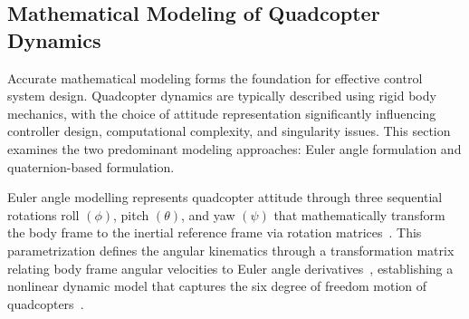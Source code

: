 



\subsection{Mathematical Modeling of Quadcopter Dynamics}

Accurate mathematical modeling forms the foundation for effective control system design. Quadcopter dynamics are typically described using rigid body mechanics, with the choice of attitude representation significantly influencing controller design, computational complexity, and singularity issues. This section examines the two predominant modeling approaches: Euler angle formulation and quaternion-based formulation.

\noindent Euler angle modelling represents quadcopter attitude through three sequential rotations roll $(\phi)$, pitch $(\theta)$, and yaw $(\psi)$ that mathematically transform the body frame to the inertial reference frame via rotation matrices~\cite{colmenares2015position,colmenares2015integral,jebelli2023fault}. This parametrization defines the angular kinematics through a transformation matrix relating body frame angular velocities to Euler angle derivatives~\cite{colmenares2015position,acosta2020real}, establishing a nonlinear dynamic model that captures the six degree of freedom motion of quadcopters~\cite{jafar2016mathematical,silva2018modelagem}. 

